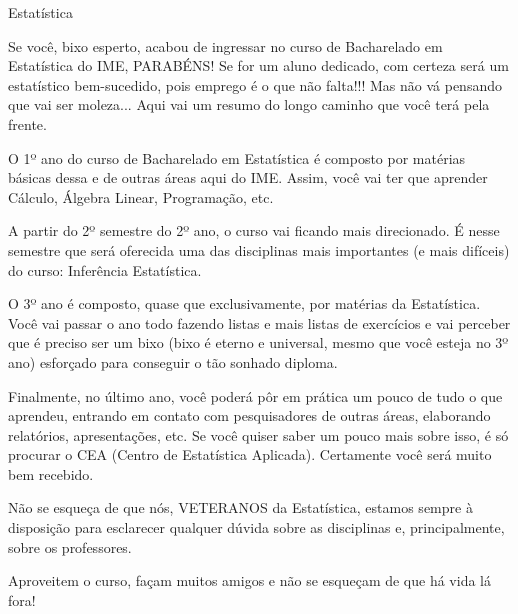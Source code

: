 \begin{subsecao}{Estatística}

Se você, bixo esperto, acabou de ingressar no curso de Bacharelado em
Estatística do IME, PARABÉNS! Se for um aluno dedicado, com certeza será
um estatístico bem-sucedido, pois emprego é o que não falta!!! Mas não vá
pensando que vai ser moleza... Aqui vai um resumo do longo caminho que você
terá pela frente.

O 1º ano do curso de Bacharelado em Estatística é composto por matérias
básicas dessa e de outras áreas aqui do IME. Assim, você vai ter que aprender
Cálculo, Álgebra Linear, Programação, etc.

A partir do 2º semestre do 2º ano, o curso vai ficando mais
direcionado. É nesse semestre que será oferecida uma das disciplinas mais
importantes (e mais difíceis) do curso: Inferência Estatística.

O 3º ano é composto, quase que exclusivamente, por matérias da
Estatística. Você vai passar o ano todo fazendo listas e mais listas de
exercícios e vai perceber que é preciso ser um bixo (bixo é eterno e universal,
mesmo que você esteja no 3º ano) esforçado para conseguir o tão sonhado
diploma.

Finalmente, no último ano, você poderá pôr em prática um pouco de tudo o que
aprendeu, entrando em contato com pesquisadores de outras áreas, elaborando
relatórios, apresentações, etc. Se você quiser saber um pouco mais sobre isso, é
só procurar o CEA (Centro de Estatística Aplicada). Certamente você será muito
bem recebido.

Não se esqueça de que nós, VETERANOS da Estatística, estamos sempre à
disposição para esclarecer qualquer dúvida sobre as disciplinas e,
principalmente, sobre os professores.

Aproveitem o curso, façam muitos amigos e não se esqueçam de que há vida lá fora!

\end{subsecao}
